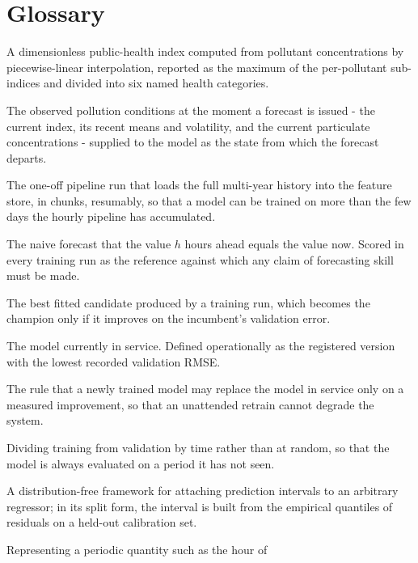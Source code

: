 \section{Glossary}
\begin{description}[style=nextline,leftmargin=1.5em,labelsep=0pt,itemsep=5pt]
  \item[Air Quality Index] A dimensionless public-health index computed from
  pollutant concentrations by piecewise-linear interpolation, reported as the
  maximum of the per-pollutant sub-indices and divided into six named health
  categories.
  \item[Anchor state] The observed pollution conditions at the moment a forecast
  is issued - the current index, its recent means and volatility, and the current
  particulate concentrations - supplied to the model as the state from which the
  forecast departs.
  \item[Backfill] The one-off pipeline run that loads the full multi-year history
  into the feature store, in chunks, resumably, so that a model can be trained on
  more than the few days the hourly pipeline has accumulated.
  \item[Baseline (persistence)] The naive forecast that the value $h$ hours ahead
  equals the value now. Scored in every training run as the reference against
  which any claim of forecasting skill must be made.
  \item[Challenger] The best fitted candidate produced by a training run, which
  becomes the champion only if it improves on the incumbent's validation error.
  \item[Champion] The model currently in service. Defined operationally as the
  registered version with the lowest recorded validation RMSE.
  \item[Champion-challenger gate] The rule that a newly trained model may replace
  the model in service only on a measured improvement, so that an unattended
  retrain cannot degrade the system.
  \item[Chronological split] Dividing training from validation by time rather than
  at random, so that the model is always evaluated on a period it has not seen.
  \item[Conformal prediction] A distribution-free framework for attaching
  prediction intervals to an arbitrary regressor; in its split form, the interval
  is built from the empirical quantiles of residuals on a held-out calibration
  set.
  \item[Cyclical encoding] Representing a periodic quantity such as the hour of

\end{description}
